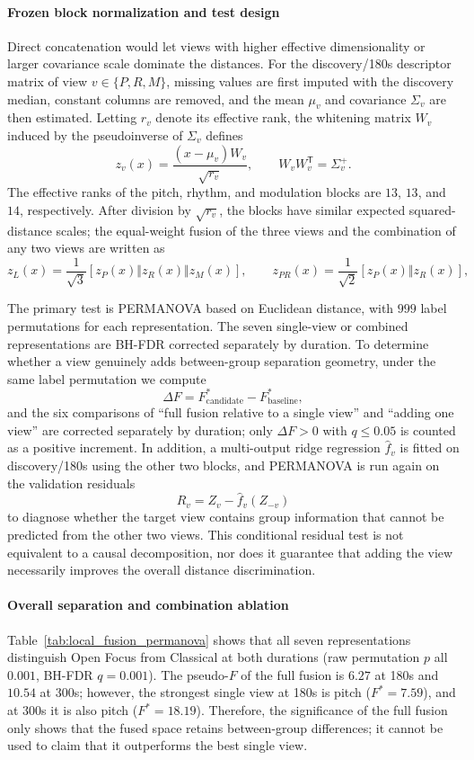 \documentclass{article}
\begin{document}
\paragraph{Frozen block normalization and test design}
Direct concatenation would let views with higher effective dimensionality or larger covariance scale dominate the distances. For the discovery/180s descriptor matrix of view $v\in\{P,R,M\}$, missing values are first imputed with the discovery median, constant columns are removed, and the mean $\mu_v$ and covariance $\Sigma_v$ are then estimated. Letting $r_v$ denote its effective rank, the whitening matrix $W_v$ induced by the pseudoinverse of $\Sigma_v$ defines
\[
z_v(x)=\frac{(x-\mu_v)W_v}{\sqrt{r_v}},
\qquad W_vW_v^{\mathsf T}=\Sigma_v^{+}.
\]
The effective ranks of the pitch, rhythm, and modulation blocks are $13$, $13$, and $14$, respectively. After division by $\sqrt{r_v}$, the blocks have similar expected squared-distance scales; the equal-weight fusion of the three views and the combination of any two views are written as
\[
z_L(x)=\frac{1}{\sqrt{3}}[z_P(x)\Vert z_R(x)\Vert z_M(x)],
\qquad
z_{PR}(x)=\frac{1}{\sqrt{2}}[z_P(x)\Vert z_R(x)],
\]

The primary test is PERMANOVA based on Euclidean distance, with $999$ label permutations for each representation. The seven single-view or combined representations are BH-FDR corrected separately by duration. To determine whether a view genuinely adds between-group separation geometry, under the same label permutation we compute
\[
\Delta F=F^{*}_{\mathrm{candidate}}-F^{*}_{\mathrm{baseline}},
\]
and the six comparisons of ``full fusion relative to a single view'' and ``adding one view'' are corrected separately by duration; only $\Delta F>0$ with $q\leq0.05$ is counted as a positive increment. In addition, a multi-output ridge regression $\widehat f_v$ is fitted on discovery/180s using the other two blocks, and PERMANOVA is run again on the validation residuals
\[
R_v=Z_v-\widehat f_v(Z_{-v})
\]
to diagnose whether the target view contains group information that cannot be predicted from the other two views. This conditional residual test is not equivalent to a causal decomposition, nor does it guarantee that adding the view necessarily improves the overall distance discrimination.

\paragraph{Overall separation and combination ablation}
Table~\ref{tab:local_fusion_permanova} shows that all seven representations distinguish Open Focus from Classical at both durations (raw permutation $p$ all $0.001$, BH-FDR $q=0.001$). The pseudo-$F$ of the full fusion is $6.27$ at 180s and $10.54$ at 300s; however, the strongest single view at 180s is pitch ($F^{*}=7.59$), and at 300s it is also pitch ($F^{*}=18.19$). Therefore, the significance of the full fusion only shows that the fused space retains between-group differences; it cannot be used to claim that it outperforms the best single view.
\end{document}
